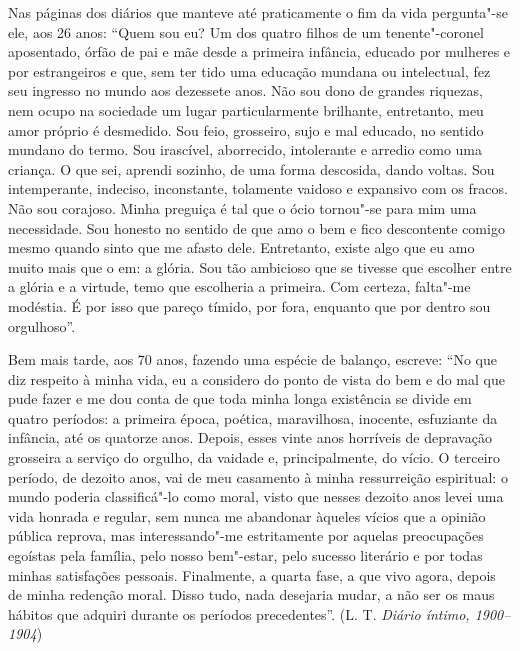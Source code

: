 Nas páginas dos diários que manteve até praticamente o fim da vida
pergunta"-se ele, aos 26 anos: ``Quem sou eu? Um dos quatro filhos de um
tenente"-coronel aposentado, órfão de pai e mãe desde a primeira
infância, educado por mulheres e por estrangeiros e que, sem ter tido
uma educação mundana ou intelectual, fez seu ingresso no mundo aos
dezessete anos. Não sou dono de grandes riquezas, nem ocupo na sociedade
um lugar particularmente brilhante, entretanto, meu amor próprio é
desmedido. Sou feio, grosseiro, sujo e mal educado, no sentido mundano
do termo. Sou irascível, aborrecido, intolerante e arredio como uma
criança. O que sei, aprendi sozinho, de uma forma descosida, dando
voltas. Sou intemperante, indeciso, inconstante, tolamente vaidoso e
expansivo com os fracos. Não sou corajoso. Minha preguiça é tal que o
ócio tornou"-se para mim uma necessidade. Sou honesto no sentido de que
amo o bem e fico descontente comigo mesmo quando sinto que me afasto
dele. Entretanto, existe algo que eu amo muito mais que o em: a glória.
Sou tão ambicioso que se tivesse que escolher entre a glória e a
virtude, temo que escolheria a primeira. Com certeza, falta"-me modéstia.
É por isso que pareço tímido, por fora, enquanto que por dentro sou
orgulhoso''.

Bem mais tarde, aos 70 anos, fazendo uma espécie de balanço, escreve:
``No que diz respeito à minha vida, eu a considero do ponto de vista do
bem e do mal que pude fazer e me dou conta de que toda minha longa
existência se divide em quatro períodos: a primeira época, poética,
maravilhosa, inocente, esfuziante da infância, até os quatorze anos.
Depois, esses vinte anos horríveis de depravação grosseira a serviço do
orgulho, da vaidade e, principalmente, do vício. O terceiro período, de
dezoito anos, vai de meu casamento à minha ressurreição espiritual: o
mundo poderia classificá"-lo como moral, visto que nesses dezoito anos
levei uma vida honrada e regular, sem nunca me abandonar àqueles vícios
que a opinião pública reprova, mas interessando"-me estritamente por
aquelas preocupações egoístas pela família, pelo nosso bem"-estar, pelo
sucesso literário e por todas minhas satisfações pessoais. Finalmente,
a quarta fase, a que vivo agora, depois de minha redenção moral. Disso
tudo, nada desejaria mudar, a não ser os maus hábitos que adquiri
durante os períodos precedentes''. (L. T. \emph{Diário íntimo,
1900--1904})

